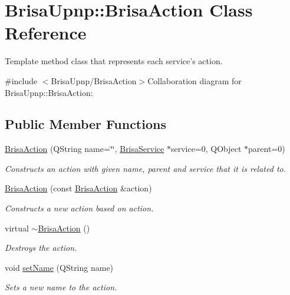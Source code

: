 \hypertarget{classBrisaUpnp_1_1BrisaAction}{
\section{BrisaUpnp::BrisaAction Class Reference}
\label{classBrisaUpnp_1_1BrisaAction}
}


Template method class that represents each service's action.  


{\ttfamily \#include $<$BrisaUpnp/BrisaAction$>$}Collaboration diagram for BrisaUpnp::BrisaAction:\subsection*{Public Member Functions}
\begin{DoxyCompactItemize}
\item 
\hyperlink{classBrisaUpnp_1_1BrisaAction_a34f7d8f1f02c5df7b280e00c0d66b785}{BrisaAction} (QString name=\char`\"{}\char`\"{}, \hyperlink{classBrisaUpnp_1_1BrisaService}{BrisaService} $\ast$service=0, QObject $\ast$parent=0)
\begin{DoxyCompactList}\small\item\em Constructs an action with given {\itshape name\/}, {\itshape parent\/} and {\itshape service\/} that it is related to. \item\end{DoxyCompactList}\item 
\hyperlink{classBrisaUpnp_1_1BrisaAction_ad8222e909463bcfc4257e7da4f5441e8}{BrisaAction} (const \hyperlink{classBrisaUpnp_1_1BrisaAction}{BrisaAction} \&action)
\begin{DoxyCompactList}\small\item\em Constructs a new action based on {\itshape action\/}. \item\end{DoxyCompactList}\item 
virtual \hyperlink{classBrisaUpnp_1_1BrisaAction_ab1cd52221450fe503694492fa1c352c4}{$\sim$BrisaAction} ()
\begin{DoxyCompactList}\small\item\em Destroys the action. \item\end{DoxyCompactList}\item 
void \hyperlink{classBrisaUpnp_1_1BrisaAction_a16390c4f715a0169bc9fd25ac2845e26}{setName} (QString name)
\begin{DoxyCompactList}\small\item\em Sets a new name to the action. \item\end{DoxyCompactList}\item 

\end{DoxyCompactItemize}
